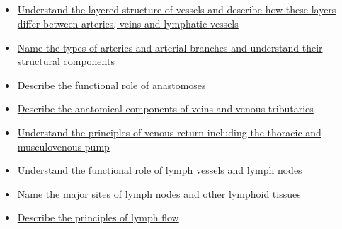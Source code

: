 \documentclass[10pt, a4paper]{article}
\newcommand{\MYhref}[3][blue]{\href{#2}{\color{#1}{#3}}}%
\begin{document}
\subsection{\MYhref[melbBlue]{https://notion.so/f325fa5415b04f5fad4365433effdad8}{Foundations of Vascular and Lymph Systems}} \begin{itemize} \item \href{https://www.notion.so/c10536a34dd14068aad3578128e880b9}{Understand the layered structure of vessels and describe how these layers differ between arteries, veins and lymphatic vessels} \item \href{https://www.notion.so/7e3a2510655c4fce9fc1c2cb0473194d}{Name the types of arteries and arterial branches and understand their structural components} \item \href{https://www.notion.so/8c3588c64a864e53a2c19ddf974442da}{Describe the functional role of anastomoses} \item \href{https://www.notion.so/8072bd996e9847ca82313b0b2b1e8e81}{Describe the anatomical components of veins and venous tributaries} \item \href{https://www.notion.so/034a784cb8864dfbbb32cbe79b2c3c2b}{Understand the principles of venous return including the thoracic and musculovenous pump} \item \href{https://www.notion.so/4448cfb0ac89442389cb8c6942d24635}{Understand the functional role of lymph vessels and lymph nodes} \item \href{https://www.notion.so/d98dd7b8b46c4f1aadd5db68eb02e6e5}{Name the major sites of lymph nodes and other lymphoid tissues} \item \href{https://www.notion.so/6f1d7c8d32964ae0a91a72bde396ba8a}{Describe the principles of lymph flow} \end{itemize}
\end{document}
